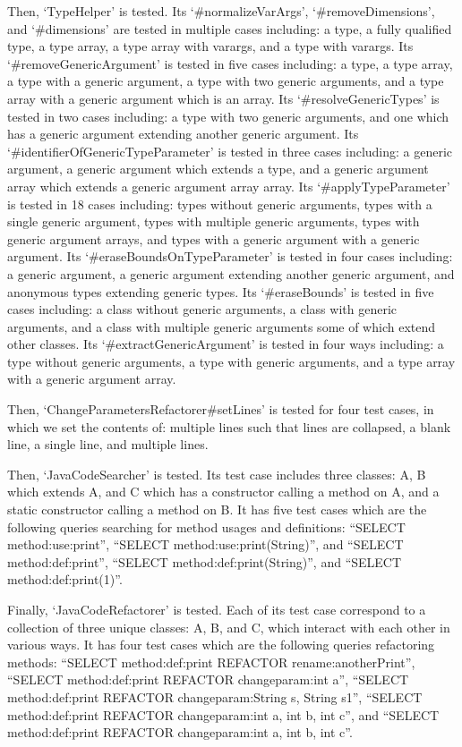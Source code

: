\documentclass[12pt, letterpaper]{article}
\begin{document}
Then, `TypeHelper' is tested.
Its `\#normalizeVarArgs', `\#removeDimensions', and `\#dimensions' are tested in multiple cases including: a type, a fully qualified type, a type array, a type array with varargs, and a type with varargs.
Its `\#removeGenericArgument' is tested in five cases including: a type, a type array, a type with a generic argument, a type with two generic arguments, and a type array with a generic argument which is an array.
Its `\#resolveGenericTypes' is tested in two cases including: a type with two generic arguments, and one which has a generic argument extending another generic argument.
Its `\#identifierOfGenericTypeParameter' is tested in three cases including: a generic argument, a generic argument which extends a type, and a generic argument array which extends a generic argument array array.
Its `\#applyTypeParameter' is tested in 18 cases including: types without generic arguments, types with a single generic argument, types with multiple generic arguments, types with generic argument arrays, and types with a generic argument with a generic argument.
Its `\#eraseBoundsOnTypeParameter' is tested in four cases including: a generic argument, a generic argument extending another generic argument, and anonymous types extending generic types.
Its `\#eraseBounds' is tested in five cases including: a class without generic arguments, a class with generic arguments, and a class with multiple generic arguments some of which extend other classes.
Its `\#extractGenericArgument' is tested in four ways including: a type without generic arguments, a type with generic arguments, and a type array with a generic argument array.

Then, `ChangeParametersRefactorer\#setLines' is tested for four test cases, in which we set the contents of: multiple lines such that lines are collapsed, a blank line, a single line, and multiple lines.

Then, `JavaCodeSearcher' is tested.
Its test case includes three classes: A, B which extends A, and C which has a constructor calling a method on A, and a static constructor calling a method on B.
It has five test cases which are the following queries searching for method usages and definitions: ``SELECT method:use:print'', ``SELECT method:use:print(String)'', and ``SELECT method:def:print'', ``SELECT method:def:print(String)'', and ``SELECT method:def:print(1)''.

Finally, `JavaCodeRefactorer' is tested.
Each of its test case correspond to a collection of three unique classes: A, B, and C, which interact with each other in various ways.
It has four test cases which are the following queries refactoring methods: ``SELECT method:def:print REFACTOR rename:anotherPrint'', ``SELECT method:def:print REFACTOR changeparam:int a'', ``SELECT method:def:print REFACTOR changeparam:String s, String s1'', ``SELECT method:def:print REFACTOR changeparam:int a, int b, int c'', and ``SELECT method:def:print REFACTOR changeparam:int a, int b, int c''.
\end{document}

